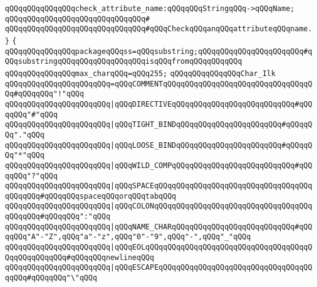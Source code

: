 \newline
\verb|qQQqqQQqqQQqqQQqcheck_attribute_name:qQQqqQQqStringqQQq->qQQqName;|\newline
\verb|qQQqqQQqqQQqqQQqqQQqqQQqqQQqqQQq#|\newline
\verb|qQQqqQQqqQQqqQQqqQQqqQQqqQQqqQQq#qQQqCheckqQQqanqQQqattributeqQQqname.|\newline
\newline
\verb|}|\newline
\verb|{|\newline
\verb|qQQqqQQqqQQqqQQqpackageqQQqss=qQQqsubstring;qQQqqQQqqQQqqQQqqQQqqQQq#qQQqsubstringqQQqqQQqqQQqqQQqqQQqisqQQqfromqQQqqQQqqQQq|\newline
\newline
\verb|qQQqqQQqqQQqqQQqmax_charqQQq=qQQq255;|\newline
\newline
\verb|qQQqqQQqqQQqqQQqChar_Ilk|\newline
\verb|qQQqqQQqqQQqqQQqqQQqqQQq=qQQqCOMMENTqQQqqQQqqQQqqQQqqQQqqQQqqQQqqQQqqQQq#qQQqqQQq"!"qQQq|\newline
\verb|qQQqqQQqqQQqqQQqqQQqqQQq|\verb#|qQQqDIRECTIVEqQQqqQQqqQQqqQQqqQQqqQQqqQQq#\verb|#qQQqqQQq"#"qQQq|\newline
\verb|qQQqqQQqqQQqqQQqqQQqqQQq|\verb#|qQQqTIGHT_BINDqQQqqQQqqQQqqQQqqQQqqQQq#\verb|#qQQqqQQq"."qQQq|\newline
\verb|qQQqqQQqqQQqqQQqqQQqqQQq|\verb#|qQQqLOOSE_BINDqQQqqQQqqQQqqQQqqQQqqQQq#\verb|#qQQqqQQq"*"qQQq|\newline
\verb|qQQqqQQqqQQqqQQqqQQqqQQq|\verb#|qQQqWILD_COMPqQQqqQQqqQQqqQQqqQQqqQQqqQQq#\verb|#qQQqqQQq"?"qQQq|\newline
\verb|qQQqqQQqqQQqqQQqqQQqqQQq|\verb#|qQQqSPACEqQQqqQQqqQQqqQQqqQQqqQQqqQQqqQQqqQQqqQQqqQQq#\verb|#qQQqqQQqspaceqQQqorqQQqtabqQQq|\newline
\verb|qQQqqQQqqQQqqQQqqQQqqQQq|\verb#|qQQqCOLONqQQqqQQqqQQqqQQqqQQqqQQqqQQqqQQqqQQqqQQqqQQq#\verb|#qQQqqQQq":"qQQq|\newline
\verb|qQQqqQQqqQQqqQQqqQQqqQQq|\verb#|qQQqNAME_CHARqQQqqQQqqQQqqQQqqQQqqQQqqQQq#\verb|#qQQqqQQq"A"-"Z",qQQq"a"-"z",qQQq"0"-"9",qQQq"-",qQQq"_"qQQq|\newline
\verb|qQQqqQQqqQQqqQQqqQQqqQQq|\verb#|qQQqEOLqQQqqQQqqQQqqQQqqQQqqQQqqQQqqQQqqQQqqQQqqQQqqQQqqQQq#\verb|#qQQqqQQqnewlineqQQq|\newline
\verb|qQQqqQQqqQQqqQQqqQQqqQQq|\verb#|qQQqESCAPEqQQqqQQqqQQqqQQqqQQqqQQqqQQqqQQqqQQqqQQq#\verb|#qQQqqQQq"\"qQQq|\newline
